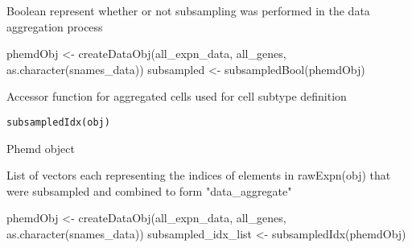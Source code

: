 \documentclass[a4paper]{book}
\begin{document}
%
\begin{Value}
Boolean represent whether or not subsampling was performed in the data aggregation process
\end{Value}
%
\begin{Examples}
\begin{ExampleCode}
phemdObj <- createDataObj(all_expn_data, all_genes, as.character(snames_data))
subsampled <- subsampledBool(phemdObj)

\end{ExampleCode}
\end{Examples}
%
\begin{Description}\relax
Accessor function for aggregated cells used for cell subtype definition
\end{Description}
%
\begin{Usage}
\begin{verbatim}
subsampledIdx(obj)
\end{verbatim}
\end{Usage}
%
\begin{Arguments}
\begin{ldescription}
\item[\code{obj}] Phemd object
\end{ldescription}
\end{Arguments}
%
\begin{Value}
List of vectors each representing the indices of elements in rawExpn(obj) that were subsampled and combined to form "data\_aggregate"
\end{Value}
%
\begin{Examples}
\begin{ExampleCode}
phemdObj <- createDataObj(all_expn_data, all_genes, as.character(snames_data))
subsampled_idx_list <- subsampledIdx(phemdObj)

\end{ExampleCode}
\end{Examples}
\printindex{}
\end{document}
